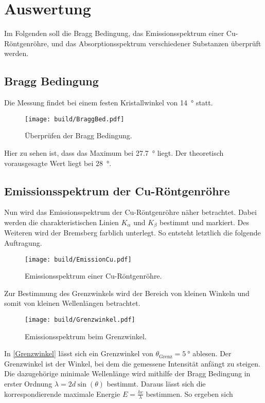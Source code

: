 %

%
\section{Auswertung}
\label{sec:Auswertung}

Im Folgenden soll die Bragg Bedingung, das Emissionsspektrum einer Cu-Röntgenröhre, und das Absorptionsspektrum verschiedener Substanzen überprüft 
werden. 

\subsection{Bragg Bedingung}
Die Messung findet bei einem festen Kristallwinkel von \qty{14}{\degree} statt.

\begin{figure}[H]
    \centering
    \texttt{[image: build/BraggBed.pdf]}
    \caption{Überprüfen der Bragg Bedingung.}
\end{figure}    

\noindent Hier zu sehen ist, dass das Maximum bei \qty{27.7}{\degree} liegt. Der theoretisch vorausgesagte Wert liegt bei \qty{28}{\degree}.  
    
\subsection{Emissionsspektrum der Cu-Röntgenröhre}
Nun wird das Emissionsspektrum der Cu-Röntgenröhre näher betrachtet. Dabei werden die charakteristischen Linien $K_\alpha$ und $K_\beta$ bestimmt 
und markiert. Des Weiteren wird der Bremsberg farblich unterlegt. So entsteht letztlich die folgende Auftragung. 

\begin{figure}[H]
    \centering
    \texttt{[image: build/EmissionCu.pdf]}
    \caption{Emissionsspektrum einer Cu-Röntgenröhre.}
\end{figure}    

\noindent Zur Bestimmung des Grenzwinkels wird der Bereich von kleinen Winkeln und somit von kleinen Wellenlängen betrachtet. 

\begin{figure}[H]
    \centering
    \texttt{[image: build/Grenzwinkel.pdf]}
    \caption{Emissionsspektrum beim Grenzwinkel.}
    \label{Grenzwinkel}
\end{figure}    

\noindent In \autoref{Grenzwinkel} lässt sich ein Grenzwinkel von $\theta_\text{Grenz} = \qty{5}{\degree}$ ablesen. Der Grenzwinkel ist der Winkel, 
bei dem die gemessene Intensität anfängt zu steigen. Die dazugehörige minimale 
Wellenlänge wird mithilfe der Bragg Bedingung in erster Ordnung $\lambda=2 d \sin(\theta)$ bestimmt. Daraus lässt sich die korrespondierende maximale 
Energie $E=\frac{hc}{\lambda}$ bestimmen. So ergeben sich 

